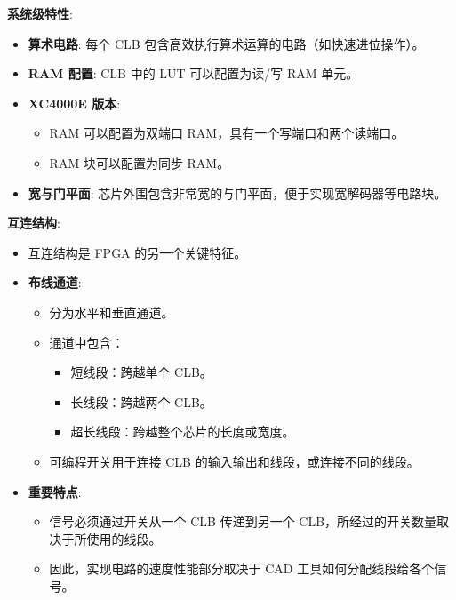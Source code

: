 \documentclass[
  ignorenonframetext,
  chinese,
]{beamer}
\providecommand{\tightlist}{%
  \setlength{\itemsep}{0pt}\setlength{\parskip}{0pt}}
\begin{document}
\begin{frame}
\begin{block}{\textbf{系统级特性}:}
\label{ux7cfbux7edfux7ea7ux7279ux6027}
\begin{itemize}
\tightlist
\item
  \textbf{算术电路}: 每个 CLB
  包含高效执行算术运算的电路（如快速进位操作）。
\item
  \textbf{RAM 配置}: CLB 中的 LUT 可以配置为读/写 RAM 单元。
\item
  \textbf{XC4000E 版本}:

  \begin{itemize}
  \tightlist
  \item
    RAM 可以配置为双端口 RAM，具有一个写端口和两个读端口。
  \item
    RAM 块可以配置为同步 RAM。
  \end{itemize}
\item
  \textbf{宽与门平面}:
  芯片外围包含非常宽的与门平面，便于实现宽解码器等电路块。
\end{itemize}
\end{block}
\end{frame}

\begin{frame}
\begin{block}{\textbf{互连结构}:}
\label{ux4e92ux8fdeux7ed3ux6784}
\begin{itemize}
\tightlist
\item
  互连结构是 FPGA 的另一个关键特征。
\item
  \textbf{布线通道}:

  \begin{itemize}
  \tightlist
  \item
    分为水平和垂直通道。
  \item
    通道中包含：

    \begin{itemize}
    \tightlist
    \item
      短线段：跨越单个 CLB。
    \item
      长线段：跨越两个 CLB。
    \item
      超长线段：跨越整个芯片的长度或宽度。
    \end{itemize}
  \item
    可编程开关用于连接 CLB 的输入输出和线段，或连接不同的线段。
  \end{itemize}
\item
  \textbf{重要特点}:

  \begin{itemize}
  \tightlist
  \item
    信号必须通过开关从一个 CLB 传递到另一个
    CLB，所经过的开关数量取决于所使用的线段。
  \item
    因此，实现电路的速度性能部分取决于 CAD 工具如何分配线段给各个信号。
  \end{itemize}
\end{itemize}
\end{block}
\end{frame}
\end{document}
